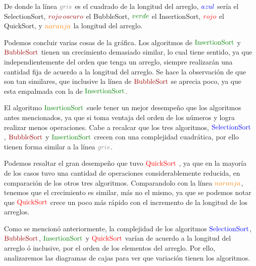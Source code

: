 \documentclass[12pt,a4paper]{article}
\begin{document}
De donde la l\'inea $\textcolor{gray}{gris}$ es el cuadrado de la longitud del arreglo, $\textcolor{blue}{azul}$ ser\'ia el SelectionSort, $\textcolor{deepred}{rojo\> oscuro}$ el BubbleSort, $\textcolor{deepgreen}{verde}$ el InsertionSort, $\textcolor{red}{rojo}$ el QuickSort, y $\textcolor{orange}{naranja}$ la longitud del arreglo.

Podemos concluir varias cosas de la gr\'afica. Los algoritmos de $\textcolor{deepgreen}{\mathrm{Insertion Sort}}$ y $\textcolor{deepred}{\mathrm{BubbleSort}}$ tienen un crecimiento demasiado similar, lo cual tiene sentido, ya que independientemente del orden que tenga un arreglo, siempre realizar\'an una cantidad fija de acuerdo a la longitud del arreglo. Se hace la observaci\'on de que son tan similares, que inclusive la l\'inea de $\textcolor{deepred}{\mathrm{BubbleSort}}$ se aprecia poco, ya que esta empalmada con la de $\textcolor{deepgreen}{\mathrm{Insertion Sort}}$.

  El algoritmo $\textcolor{deepgreen}{\mathrm{Insertion Sort}}$ suele tener un mejor desempe\~no que los algoritmos antes mencionados, ya que si toma ventaja del orden de los n\'umeros y logra realizar menos operaciones. Cabe a recalcar que los tres algoritmos, $\textcolor{blue}{\mathrm{SelectionSort}}$, $\textcolor{deepred}{\mathrm{BubbleSort}}$ y $\textcolor{deepgreen}{\mathrm{Insertion Sort}}$ crecen con una complejidad cuadr\'atica, por ello tienen forma similar a la l\'inea $\textcolor{gray}{gris}$.

Podemos resaltar el gran desempe\~no que tuvo $\textcolor{red}{\mathrm{QuickSort}}$
, ya que en la mayor\'ia de los casos tuvo una cantidad de operaciones considerablemente reducida, en comparaci\'on de los otros tres algoritmos. Comparandolo con la l\'inea $\textcolor{orange}{naranja}$, tenemos que el crecimiento es similar, m\'as no el mismo, ya que se podemos notar que $\textcolor{red}{\mathrm{QuickSort}}$
 crece un poco m\'as r\'apido con el incremento de la longitud de los arreglos.

Como se mencion\'o anteriormente, la complejidad de los algoritmos $\textcolor{blue}{\mathrm{SelectionSort}}$, $\textcolor{deepred}{\mathrm{BubbleSort}}$, $\textcolor{deepgreen}{\mathrm{Insertion Sort}}$ y $\textcolor{red}{\mathrm{QuickSort}}$
 var\'ian de acuerdo a la longitud del arreglo \'o inclusive, por el orden de los elementos del arreglo. Por ello, analizaremos las diagramas de cajas para ver que variaci\'on tienen los algoritmos.
\end{document}
